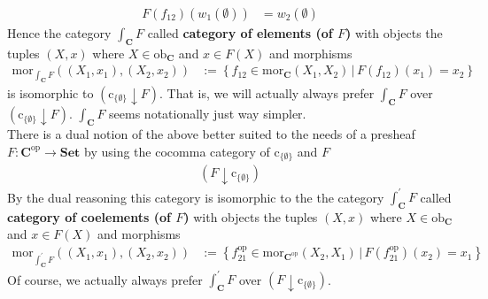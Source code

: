 \begin{enumerate}
\begin{align*}
  F(f_{12})(w_{1}(\emptyset))
  &=
  w_{2}(\emptyset)
\end{align*}
Hence the category $\int_{\mathbf{C}}F$ called \textbf{category of elements (of $F$)} with objects the tuples $(X,x)$ where $X \in \mathrm{ob}_{\mathbf{C}}$ and $x \in F(X)$ and morphisms
\begin{align*}
  \mathrm{mor}_{\int_{\mathbf{C}}F}
  \left(
    (X_{1},x_{1}),
    (X_{2},x_{2})
  \right)
  &:=
  \left\lbrace
      f_{12}
      \in
      \mathrm{mor}_{\mathbf{C}}(X_{1},X_{2})
    \,
    \vert
    \,
      F(f_{12})(x_{1})
      =
      x_{2}
  \right\rbrace
\end{align*}
is isomorphic to $(\mathrm{c}_{\lbrace \emptyset \rbrace} \downarrow F)$. That is, we will actually always prefer $\int_{\mathbf{C}}F$ over $(\mathrm{c}_{\lbrace \emptyset \rbrace} \downarrow F)$. $\int_{\mathbf{C}}F$ seems notationally just way simpler.
\\
There is a dual notion of the above better suited to the needs of a presheaf $F \colon \mathbf{C}^{\mathrm{op}} \rightarrow \mathbf{Set}$ by using the cocomma category of $\mathrm{c}_{\lbrace \emptyset \rbrace}$ and $F$
\begin{align*}
  (F \downarrow \mathrm{c}_{\lbrace \emptyset \rbrace})
\end{align*}
By the dual reasoning this category is isomorphic to the the category $\int_{\mathbf{C}}^{\prime}F$ called \textbf{category of coelements (of $F$)} with objects the tuples $(X,x)$ where $X \in \mathrm{ob}_{\mathbf{C}}$ and $x \in F(X)$ and morphisms
\begin{align*}
  \mathrm{mor}_{\int_{\mathbf{C}}^{\prime}F}
  \left(
    (X_{1},x_{1}),
    (X_{2},x_{2})
  \right)
  &:=
  \left\lbrace
      f_{21}^{\mathrm{op}}
      \in
      \mathrm{mor}_{\mathbf{C}^{\mathrm{op}}}(X_{2},X_{1})
    \,
    \vert
    \,
      F(f_{21}^{\mathrm{op}})(x_{2})
      =
      x_{1}
  \right\rbrace
\end{align*}
Of course, we actually always prefer $\int_{\mathbf{C}}^{\prime}F$ over $(F \downarrow \mathrm{c}_{\lbrace \emptyset \rbrace})$.
\end{enumerate}
